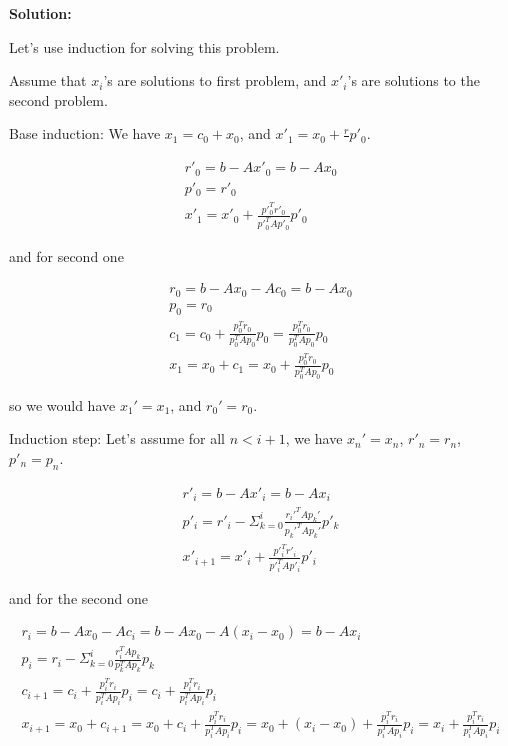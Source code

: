 \documentclass{article}
\begin{document}
\begin{enumerate}[leftmargin=\labelsep]
		\textbf{Solution: }

		Let's use induction for solving this problem.

		Assume that $x_i$'s are solutions to first problem, and $x'_i$'s are solutions to the second problem.

		Base induction: We have $x_1 = c_0 + x_0$, and $x'_1 = x_0 + \frac{r}{} p'_0$.

		\begin{align}
			r'_0 = b - Ax'_0 = b - Ax_0\\
			p'_0 = r'_0\\
			x'_1 = x'_0 + \frac{p'^T_0r'_0}{p'^T_0Ap'_0} p'_0
		\end{align}

		and for second one

		\begin{align}
			r_0 = b - Ax_0 - Ac_0 = b - Ax_0\\
			p_0 = r_0\\
			c_1 = c_0 +  \frac{p^T_0r_0}{p^T_0Ap_0} p_0 = \frac{p^T_0r_0}{p^T_0Ap_0} p_0\\
			x_1 = x_0 + c_1 = x_0 + \frac{p^T_0r_0}{p^T_0Ap_0} p_0
		\end{align}

		so we would have $x_1' = x_1$, and $r_0' = r_0$.

		Induction step: Let's assume for all $n < i+1$, we have $x_n' = x_n$, $r'_n = r_n$, $p'_n = p_n$.

		\begin{align}
			r'_i = b - Ax'_i = b - Ax_i\\
			p'_i = r'_i - \Sigma_{k=0}^{i} \frac{r_i'^T A p_k'}{p_k'^T A p_k'} p'_k\\
			x'_{i+1} = x'_i + \frac{p'^T_ir'_i}{p'^T_iAp'_i} p'_i
		\end{align}

		and for the second one

		\begin{align}
			r_{i} = b - Ax_0 - Ac_i = b - Ax_0 - A(x_i - x_0) = b - Ax_i\\
			p_i = r_i - \Sigma_{k=0}^{i} \frac{r_i^T A p_k}{p_k^T A p_k} p_k\\
			c_{i+1} = c_i +  \frac{p^T_ir_i}{p^T_iAp_i} p_i = c_i + \frac{p^T_ir_i}{p^T_iAp_i} p_i\\
			x_{i+1} = x_0 + c_{i+1} = x_0 + c_i +  \frac{p^T_ir_i}{p^T_iAp_i} p_i = x_0 + (x_i - x_0) +  \frac{p^T_ir_i}{p^T_iAp_i} p_i = x_i + \frac{p^T_ir_i}{p^T_iAp_i} p_i
		\end{align}


\end{enumerate}
\end{document}
